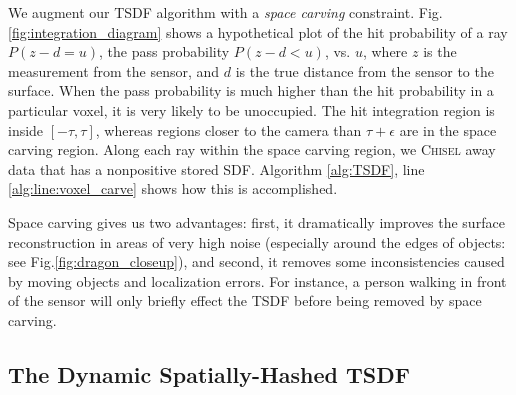 \documentclass[conference]{IEEEtran}
\newcommand{\figref}[1]{Fig.\ref{#1}}
\newcommand{\TSDF}{TSDF\xspace}
\newcommand{\chisel}{\textsc{Chisel}\xspace}
\begin{document}
We augment our \TSDF algorithm with a \textit{space carving}
\cite{Elfes1989} constraint.   \figref{fig:integration_diagram} shows a hypothetical
plot of the hit probability of a ray $P\left(z - d = u \right) $, the pass probability
$P\left(z - d < u\right)$, vs. $u$, where $z$ is the measurement from the
sensor, and $d$ is the true distance from the sensor to the surface. When the
pass probability is much higher than the hit probability in a particular voxel,
it is very likely to be unoccupied. The hit integration region is inside
$[-\tau, \tau]$, whereas regions closer to the camera than  $\tau + \epsilon$
are in the space carving region. Along each ray within the space carving region,
we \chisel away data that has a nonpositive stored SDF. Algorithm
\ref{alg:TSDF}, line \ref{alg:line:voxel_carve} shows how this is
accomplished.

Space carving gives us two advantages: first, it dramatically improves the
surface reconstruction in areas of very high noise (especially around the edges
of objects: see \figref{fig:dragon_closeup}), and second, it removes
some inconsistencies caused by moving objects and localization errors. For
instance, a person walking in front of the sensor will only briefly effect the
\TSDF before being removed by space carving.
 
\subsection{The Dynamic Spatially-Hashed \TSDF}
\label{section:spatialhash}
\end{document}
